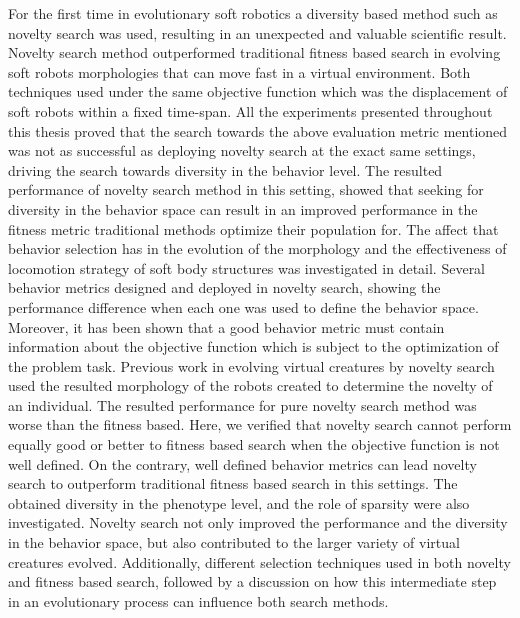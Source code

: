For the first time in evolutionary soft robotics a diversity based method such as novelty search was used, resulting in an unexpected and valuable scientific result. Novelty search method outperformed traditional fitness based search in evolving soft robots morphologies that can move fast in a virtual environment.
Both techniques used under the same objective function which was the displacement of soft robots within a fixed time-span. All the experiments presented throughout this thesis proved that the search towards the above evaluation metric mentioned was not as successful as deploying novelty search at the exact same settings, driving the search towards diversity in the behavior level. The resulted performance of novelty search method in this setting, showed that seeking for diversity in the behavior space can result in an improved performance in the fitness metric traditional methods optimize their population for. The affect that behavior selection has in the evolution of the morphology and the effectiveness of locomotion strategy of soft body structures was investigated in detail. Several behavior metrics designed and deployed in novelty search, showing the performance difference when each one was used to define the behavior space. Moreover, it has been shown that a good behavior metric must contain information about the objective function which is subject to the optimization of the problem task. Previous work in evolving virtual creatures by novelty search~\citep{lehman2011evolving} used the resulted morphology of the robots created to determine the novelty of an individual. The resulted performance for pure novelty search method was worse than the fitness based. Here, we verified that novelty search cannot perform equally good or better to fitness based search when the objective function is not well defined. On the contrary, well defined behavior metrics can lead novelty search to outperform traditional fitness based search in this settings. The obtained diversity in the phenotype level, and the role of sparsity were also investigated. Novelty search not only improved the performance and the diversity in the behavior space, but also contributed to the larger variety of virtual creatures evolved. Additionally, different selection techniques used in both novelty and fitness based search, followed by a discussion on how this intermediate step in an evolutionary process can influence both search methods. 

